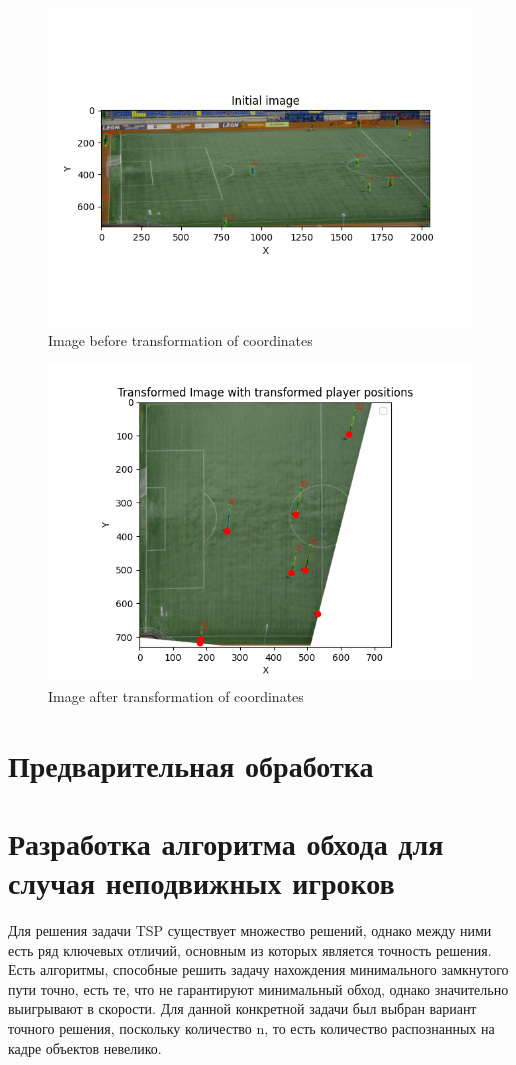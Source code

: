  \begin{figure}[!h]
     \centering
     \includegraphics[width=0.8\linewidth]{figures/Initial image.png}
     \caption{Image before transformation of coordinates}
     \label{fig:before-transform}
 \end{figure}

  \begin{figure}[!h]
     \centering
     \includegraphics[width=0.8\linewidth]{figures/Transformed Image with transformed player positions.png}
     \caption{Image after transformation of coordinates}
     \label{fig:after-transform}
 \end{figure}


 \section{Предварительная обработка}

 \section{Разработка алгоритма обхода для случая неподвижных игроков   }
Для решения задачи TSP существует множество решений, однако между ними есть ряд ключевых отличий, основным из которых является точность решения. Есть алгоритмы, способные решить задачу нахождения минимального замкнутого пути точно, есть те, что не гарантируют минимальный обход, однако значительно выигрывают в скорости. Для данной конкретной задачи был выбран вариант точного решения, поскольку количество n, то есть количество распознанных на кадре объектов невелико.

